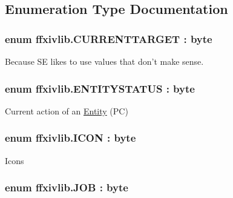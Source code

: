 \subsection{Enumeration Type Documentation}
\hypertarget{namespaceffxivlib_a027fd426531e3a42243f5c2b946dde31}{
\subsubsection[{C\-U\-R\-R\-E\-N\-T\-T\-A\-R\-G\-E\-T}]{\setlength{\rightskip}{0pt plus 5cm}enum {\bf ffxivlib.\-C\-U\-R\-R\-E\-N\-T\-T\-A\-R\-G\-E\-T} \-: byte}}\label{namespaceffxivlib_a027fd426531e3a42243f5c2b946dde31}


Because S\-E likes to use values that don't make sense. 

\hypertarget{namespaceffxivlib_a93f054414b7ccf7ba7c36f54fcc392f5}{
\subsubsection[{E\-N\-T\-I\-T\-Y\-S\-T\-A\-T\-U\-S}]{\setlength{\rightskip}{0pt plus 5cm}enum {\bf ffxivlib.\-E\-N\-T\-I\-T\-Y\-S\-T\-A\-T\-U\-S} \-: byte}}\label{namespaceffxivlib_a93f054414b7ccf7ba7c36f54fcc392f5}


Current action of an \hyperlink{classffxivlib_1_1_entity}{Entity} (P\-C) 

\hypertarget{namespaceffxivlib_a3a6b3a65a3fc9ba42586b2ccc07e4aac}{
\subsubsection[{I\-C\-O\-N}]{\setlength{\rightskip}{0pt plus 5cm}enum {\bf ffxivlib.\-I\-C\-O\-N} \-: byte}}\label{namespaceffxivlib_a3a6b3a65a3fc9ba42586b2ccc07e4aac}


Icons 

\hypertarget{namespaceffxivlib_a7273810711af045adb7151580e025a86}{
\subsubsection[{J\-O\-B}]{\setlength{\rightskip}{0pt plus 5cm}enum {\bf ffxivlib.\-J\-O\-B} \-: byte}}\label{namespaceffxivlib_a7273810711af045adb7151580e025a86}


